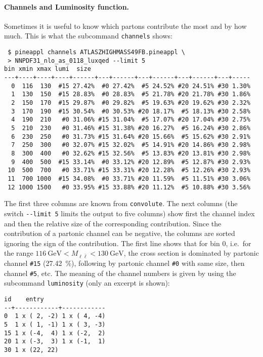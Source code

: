 \paragraph{Channels and Luminosity function.}
Sometimes it is useful to know which partons contribute the most and by how much.
This is what the subcommand \texttt{channels} shows:
\begin{verbatim}
 $ pineappl channels ATLASZHIGHMASS49FB.pineappl \
 > NNPDF31_nlo_as_0118_luxqed --limit 5
bin xmin xmax lumi  size
---+----+----+----+------+---+------+---+------+---+------+---+-----
  0  116  130  #15 27.42%  #0 27.42%  #5 24.52% #20 24.51% #30 1.30%
  1  130  150  #15 28.83%  #0 28.83%  #5 21.78% #20 21.78% #30 1.86%
  2  150  170  #15 29.87%  #0 29.82%  #5 19.63% #20 19.62% #30 2.32%
  3  170  190  #15 30.54%  #0 30.53% #20 18.17%  #5 18.13% #30 2.58%
  4  190  210   #0 31.06% #15 31.04%  #5 17.07% #20 17.04% #30 2.75%
  5  210  230   #0 31.46% #15 31.38% #20 16.27%  #5 16.24% #30 2.86%
  6  230  250   #0 31.73% #15 31.64% #20 15.66%  #5 15.62% #30 2.91%
  7  250  300   #0 32.07% #15 32.02%  #5 14.91% #20 14.86% #30 2.98%
  8  300  400   #0 32.62% #15 32.56%  #5 13.83% #20 13.81% #30 2.98%
  9  400  500  #15 33.14%  #0 33.12% #20 12.89%  #5 12.87% #30 2.93%
 10  500  700   #0 33.71% #15 33.31% #20 12.28%  #5 12.26% #30 2.93%
 11  700 1000  #15 34.08%  #0 33.71% #20 11.59%  #5 11.51% #30 3.06%
 12 1000 1500   #0 33.95% #15 33.88% #20 11.12%  #5 10.88% #30 3.56%
\end{verbatim}
The first three columns are known from \texttt{convolute}.
The next columns (the switch \texttt{-{}-limit 5} limits the output to five columns) show first the channel index and then the relative size of the corresponding contribution.
Since the contribution of a partonic channel can be negative, the columns are sorted ignoring the sign of the contribution.
The first line shows that for bin 0, i.e.\ for the range $\SI{116}{\giga\electronvolt} < M_{\ell \bar{\ell}} < \SI{130}{\giga\electronvolt}$, the cross section is dominated by partonic channel \texttt{\#15} (\SI{27.42}{\percent}), following by partonic channel \texttt{\#0} with same size, then channel \texttt{\#5}, etc.
The meaning of the channel numbers is given by using the subcommand \texttt{luminosity} (only an excerpt is shown):
\begin{verbatim}
id    entry
--+------------+------------
0  1 x ( 2, -2) 1 x ( 4, -4)
5  1 x ( 1, -1) 1 x ( 3, -3)
15 1 x (-4,  4) 1 x (-2,  2)
20 1 x (-3,  3) 1 x (-1,  1)
30 1 x (22, 22)
\end{verbatim}
